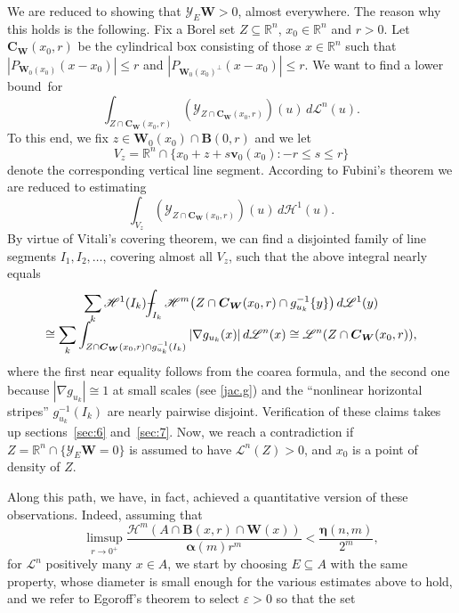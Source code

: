 \documentclass[11pt]{article}
\theoremstyle{definition}
\theoremstyle{jepanonymous}
\theoremstyle{plain}
\newcommand{\R}{\mathbb{R}}
\newcommand{\Rn}{\R^n}
\newcommand{\calH}{\mathscr{H}}
\newcommand{\calL}{\mathscr{L}}
\newcommand{\calY}{\mathscr{Y}}
\newcommand{\balpha}{\boldsymbol{\alpha}}
\newcommand{\boldeta}{\boldsymbol{\eta}}
\newcommand{\bB}{{\boldsymbol{B}}}
\newcommand{\bC}{{\boldsymbol{C}}}
\newcommand{\bW}{{\boldsymbol{W}}}
\newcommand{\bv}{{\boldsymbol{v}}}
\def\Xint#1{\mathchoice
{\XXint\displaystyle\textstyle{#1}}{\XXint\textstyle\scriptstyle{#1}}{\XXint\scriptstyle\scriptscriptstyle{#1}}{\XXint\scriptscriptstyle
\scriptscriptstyle{#1}}\!\int}
\def\XXint#1#2#3{{\setbox0=\hbox{$#1{#2#3}{\int}$}
\vcenter{\hbox{$#2#3$}}\kern-.5\wd0}}
\def\dashint{\Xint-}
\let\veps\varepsilon
\let\subset\subseteq
\begin{document}
We are reduced to showing that $\calY_E \bW > 0$, almost everywhere.
The reason why this holds is the following.
Fix a Borel set $Z \subset \Rn$, $x_0 \in \Rn$ and $r > 0$.
Let $\bC_\bW(x_0,r)$ be the cylindrical box consisting of those $x \in \Rn$ such that $\left|P_{\bW_0(x_0)}(x-x_0) \right| \leq r$ and $\left|P_{\bW_0(x_0)^\perp}(x-x_0) \right| \leq r$.
We want to find a lower bound~for
\begin{equation*}
\int_{Z \cap \bC_\bW(x_0,r)} \left(\calY_{Z \cap \bC_\bW(x_0,r)}\right)(u) \,d\calL^n(u).
\end{equation*}
To this end, we fix $z \in \bW_0(x_0) \cap \bB(0,r)$ and we let
\[
V_z = \Rn \cap \{ x_0 + z + s\bv_0(x_0): -r \leq s \leq r \}
\]
denote the corresponding vertical line segment.
According to Fubini's theorem we are reduced to estimating
\begin{equation*}
\int_{V_z} \left(\calY_{Z \cap \bC_\bW(x_0,r)}\right)(u) \,d\calH^1(u).
\end{equation*}
By virtue of Vitali's covering theorem, we can find a disjointed family of line segments $I_1,I_2,\ldots$, covering almost all $V_z$, such that the above integral nearly equals
\begin{multline*}
\sum_k \calH^1(I_k) \dashint_{I_k} \calH^m \bigl(Z \cap \bC_\bW(x_0,r) \cap g_{u_k}^{-1} \{y\}\bigr) \,d\calL^1(y) \\[-5pt]
\cong \sum_k \int_{ Z \cap \bC_\bW(x_0,r) \cap g_{u_k}^{-1} (I_k)} | \nabla g_{u_k}(x)| \,d\calL^n(x) \cong \calL^n(Z \cap \bC_\bW(x_0,r)),
\end{multline*}
where the first near equality follows from the coarea formula, and the second one because $\left| \nabla g_{u_k} \right| \cong 1$ at small scales (see \ref{jac.g}) and the ``nonlinear horizontal stripes'' $g_{u_k}^{-1} (I_k)$ are nearly pairwise disjoint.
Verification of these claims takes up sections~\ref{sec:6} and~\ref{sec:7}.
Now, we reach a contradiction if $Z = \Rn \cap \{ \calY_E \bW = 0\}$ is assumed to have $\calL^n(Z) > 0$, and $x_0$ is a point of density of $Z$.
\par
Along this path, we have, in fact, achieved a quantitative version of these observations.
Indeed, assuming that
\[
\limsup_{r \to 0^+} \frac{\calH^m (A \cap \bB(x,r) \cap \bW(x))}{\balpha(m)r^m} < \frac{\boldeta(n,m)}{2^m},
\]
for $\calL^n$ positively many $x \in A$, we start by choosing $E \subset A$ with the same property, whose diameter is small enough for the various estimates above to hold, and we refer to Egoroff's theorem to select $\veps > 0$ so that the set
\end{document}
